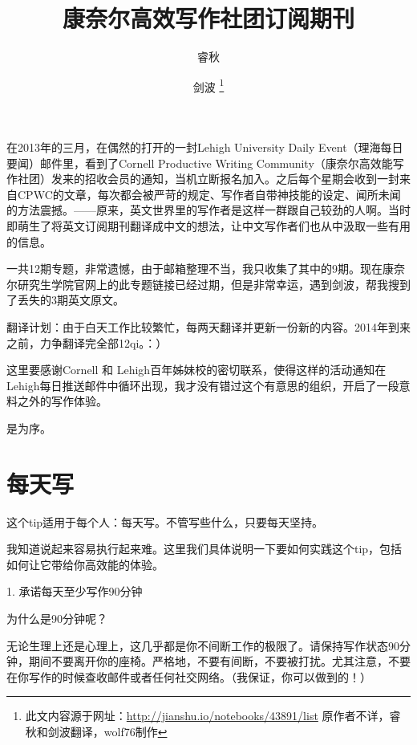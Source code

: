\documentclass[12pt]{ctexart}
\begin{document}
\heiti
{}

\title {\large {\heiti 康奈尔高效写作社团订阅期刊}}
\author {睿秋 \and 剑波
    \footnote{\scriptsize{此文内容源于网址：\url{http://jianshu.io/notebooks/43891/list} \newline \hspace*{1.8\ccwd}原作者不详，睿秋和剑波翻译，wolf76制作}}}
\maketitle

在2013年的三月，在偶然的打开的一封Lehigh University Daily Event（理海每日要闻）邮件里，看到了Cornell Productive Writing Community（康奈尔高效能写作社团）发来的招收会员的通知，当机立断报名加入。之后每个星期会收到一封来自CPWC的文章，每次都会被严苛的规定、写作者自带神技能的设定、闻所未闻的方法震撼。——原来，英文世界里的写作者是这样一群跟自己较劲的人啊。当时即萌生了将英文订阅期刊翻译成中文的想法，让中文写作者们也从中汲取一些有用的信息。

一共12期专题，非常遗憾，由于邮箱整理不当，我只收集了其中的9期。现在康奈尔研究生学院官网上的此专题链接已经过期，但是非常幸运，遇到剑波，帮我搜到了丢失的3期英文原文。

翻译计划：由于白天工作比较繁忙，每两天翻译并更新一份新的内容。2014年到来之前，力争翻译完全部12qi。：）

这里要感谢Cornell 和 Lehigh百年姊妹校的密切联系，使得这样的活动通知在Lehigh每日推送邮件中循环出现，我才没有错过这个有意思的组织，开启了一段意料之外的写作体验。

是为序。
\newpage

\tableofcontents %
\newpage %

\section{每天写}
这个tip适用于每个人：每天写。不管写些什么，只要每天坚持。

我知道说起来容易执行起来难。这里我们具体说明一下要如何实践这个tip，包括如何让它带给你高效能的体验。

1. 承诺每天至少写作90分钟

为什么是90分钟呢？

无论生理上还是心理上，这几乎都是你不间断工作的极限了。请保持写作状态90分钟，期间不要离开你的座椅。严格地，不要有间断，不要被打扰。尤其注意，不要在你写作的时候查收邮件或者任何社交网络。（我保证，你可以做到的！）
\end{document}
